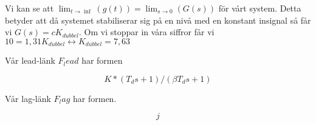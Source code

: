 \documentclass{acm_proc_article-sp}
\begin{document}
Vi kan se att $\lim_{t \rightarrow \inf}(g(t)) = \lim_{s \rightarrow 0}(G(s))$ för vårt system. Detta betyder att då systemet stabiliserar sig på en nivå med en konstant insignal så får vi $G(s) = c K_{dubbel}$. Om vi stoppar in våra siffror får vi $10 = 1,31 K_{dubbel} \leftrightarrow K_{dubbel} = 7,63$

Vår lead-länk $F_lead$ har formen

\begin{equation}
 K*(T_d s + 1)/(\beta T_d s +1)
\end{equation}

Vår lag-länk $F_lag$ har formen.

\begin{equation}
j
\end{equation}




\balancecolumns
\end{document}
